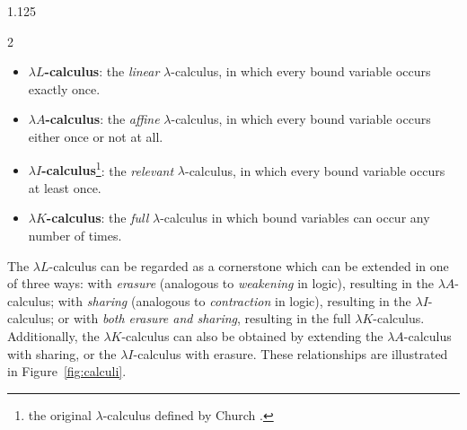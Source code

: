 \documentclass[10pt]{article}
\begin{document}
\begin{spacing}{1.125}
\begin{multicols}{2}
\vspace{-0.2cm}
\begin{itemize}
\itemsep0em
\item \textbf{\mbox{$\lambda L$-calculus}}: the \textit{linear} \mbox{$\lambda$-calculus}, in which every bound variable occurs exactly once.
\item \textbf{\mbox{$\lambda A$-calculus}}: the \textit{affine} \mbox{$\lambda$-calculus}, in which every bound variable occurs either once or not at all.
\item \textbf{\mbox{$\lambda I$-calculus}}\footnote{the original \mbox{$\lambda$-calculus} defined by Church \cite{Chu36,Chu41}.}:
the \textit{relevant} \mbox{$\lambda$-calculus}, in which every bound variable occurs at least once.
\item \textbf{\mbox{$\lambda K$-calculus}}: the \textit{full} \mbox{$\lambda$-calculus} in which bound variables can occur any number of times.
\end{itemize}
\vspace{-0.1cm}

The \mbox{$\lambda L$-calculus} can be regarded as a cornerstone which can be extended in one of three ways: with \textit{erasure} (analogous to \textit{weakening} in logic), resulting in the \mbox{$\lambda A$-calculus}; with \textit{sharing} (analogous to \textit{contraction} in logic), resulting in the \mbox{$\lambda I$-calculus}; or with \textit{both erasure and sharing}, resulting in the full \mbox{$\lambda K$-calculus}. Additionally, the \mbox{$\lambda K$-calculus} can also be obtained by extending the \mbox{$\lambda A$-calculus} with sharing, or the \mbox{$\lambda I$-calculus} with erasure. These relationships are illustrated in \mbox{Figure \ref{fig:calculi}}.

\begin{figure}[H]
  \vspace{-5pt}
  \centering
\end{figure}
\end{multicols}
\end{spacing}
\end{document}
